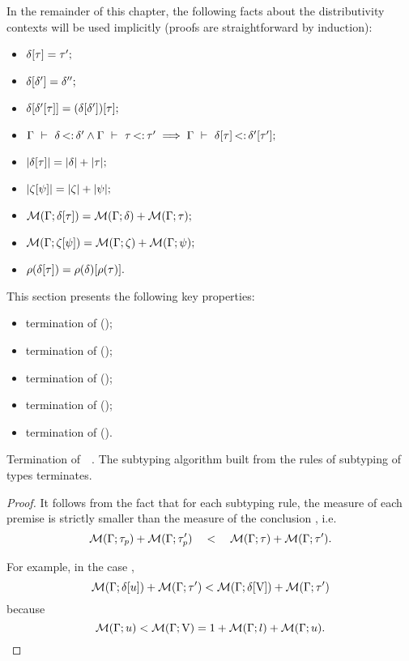 In the remainder of this chapter, the following facts about
the distributivity contexts
will be used implicitly (proofs are straightforward by induction):
\begin{itemize}
    \item $\delta[\tau] = \tau';$
    \item $\delta[\delta'] = \delta'';$
    \item $\delta[\delta'[\tau]] = 
        (\delta[\delta'])[\tau];$
    \item $\Gamma\ \vdash\ \delta \operatorname{<:} \delta' \land \Gamma\ \vdash\ \tau \operatorname{<:} \tau'
        \implies \Gamma\ \vdash\ \delta[\tau] \operatorname{<:} \delta'[\tau'];$
    \item $|\delta[\tau]| = |\delta| + |\tau|;$
    \item $|\zeta[\psi]| = |\zeta| + |\psi|;$
    \item $\operatorname{\mathcal{M}}(\Gamma;\delta[\tau]) = \operatorname{\mathcal{M}}(\Gamma;\delta) + \operatorname{\mathcal{M}}(\Gamma;\tau);$
    \item $\operatorname{\mathcal{M}}(\Gamma;\zeta[\psi]) = 
        \operatorname{\mathcal{M}}(\Gamma;\zeta) + \operatorname{\mathcal{M}}(\Gamma;\psi);$
    \item $\rho(\delta[\tau]) = 
        \rho(\delta)[\rho(\tau)].$    
\end{itemize}

This section presents the following key properties:
\begin{itemize}
    \item termination of  ();
    \item termination of  ();
    \item termination of  ();
    \item termination of \solvectrdflt ();
    \item termination of  ().
\end{itemize}

\begin{theorem}{Termination of\ \ .}%
\label{thm:subty-terminates}
    The subtyping algorithm built from the rules of subtyping of types
     terminates.
\end{theorem}
\begin{proof}
    It follows from the fact that for each subtyping rule, 
    the measure of each premise 
    is strictly smaller than the measure 
    of the conclusion , i.e.
    \[\operatorname{\mathcal{M}}(\Gamma;\tau_p) + \operatorname{\mathcal{M}}(\Gamma;\tau'_p) \quad<\quad 
    \operatorname{\mathcal{M}}(\Gamma;\tau) + \operatorname{\mathcal{M}}(\Gamma;\tau').\]

    For example, in the case ,
    \[\operatorname{\mathcal{M}}(\Gamma;\delta[u]) + \operatorname{\mathcal{M}}(\Gamma;\tau') < 
    \operatorname{\mathcal{M}}(\Gamma;\delta[\mathrm{V}]) + \operatorname{\mathcal{M}}(\Gamma;\tau')\]
    because \[\operatorname{\mathcal{M}}(\Gamma;u) < \operatorname{\mathcal{M}}(\Gamma;\mathrm{V}) = 
        1 + \operatorname{\mathcal{M}}(\Gamma;l) + \operatorname{\mathcal{M}}(\Gamma;u).\]
\end{proof}

